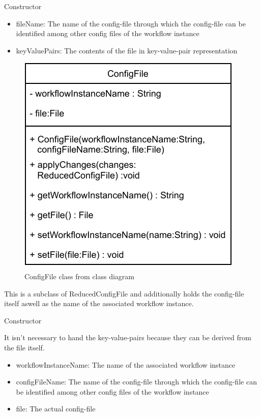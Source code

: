 \begin{methodenv}{Constructor}


\begin{itemize}
	\item{fileName:}
	The name of the config-file through which the config-file can be identified among other config files of the workflow instance
	\item{keyValuePairs:}
	The contents of the file in key-value-pair representation
\end{itemize}
\end{methodenv}



\begin{figure}[h]
\centerline{\includegraphics[scale=1]{res/Klassen/ConfigFile.pdf}}
\caption{ConfigFile class from class diagram}
\end{figure}

This is a subclass of ReducedConfigFile and additionally holds the config-file itself aswell as the name of the associated workflow instance.

\begin{methodenv}{Constructor}

It isn't necessary to hand the key-value-pairs because they can be derived from the file itself.

\begin{itemize}
	\item{workflowInstanceName:}
	The name of the associated workflow instance
	\item{configFileName:}
	The name of the config-file through which the config-file can be identified among other config files of the workflow instance
	\item{file:}
	The actual config-file
\end{itemize}
\end{methodenv}

